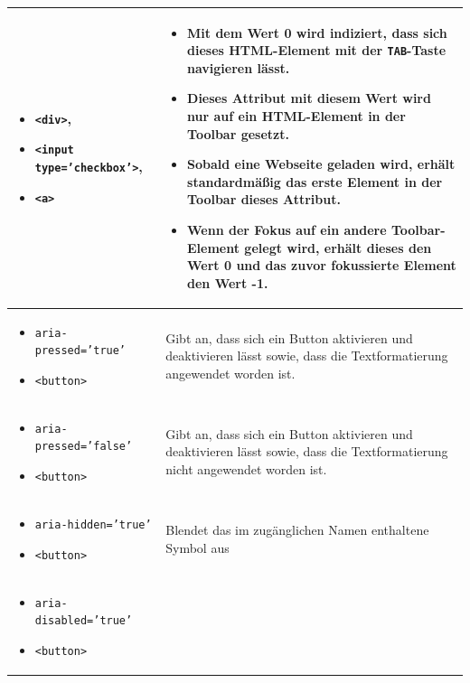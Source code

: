 \begin{longtable}{| p{} | p{} |}
\begin{itemize}[label={}, leftmargin=*]
		\item \texttt{<div>},
		\item \texttt{<input type='checkbox'>},
		\item \texttt{<a>}
	\end{itemize} 
	 & \begin{itemize}
		\item Mit dem Wert 0 wird indiziert, dass sich dieses HTML-Element mit der \texttt{TAB}-Taste navigieren 
		lässt.
		\item  Dieses Attribut mit diesem Wert wird nur auf ein HTML-Element in der Toolbar gesetzt.
		\item Sobald eine Webseite geladen wird, erhält standardmäßig das erste Element in der Toolbar dieses 
			Attribut.
		\item Wenn der Fokus auf ein andere Toolbar-Element gelegt wird, erhält dieses den Wert 0 und das 
			zuvor fokussierte Element den Wert -1.
	\end{itemize} \\
	\hline
	\begin{itemize}[label={}, leftmargin=*]
		\item \texttt{aria-pressed='true'} 
		\item \texttt{<button>}
	\end{itemize}
	& Gibt an, dass sich ein Button aktivieren und deaktivieren lässt sowie, dass die 	
		Textformatierung angewendet worden ist.\\
	\hline
	\begin{itemize}[label={}, leftmargin=*]
		\item \texttt{aria-pressed='false'}
		\item \texttt{<button>}
	\end{itemize}
	 & Gibt an, dass sich ein Button aktivieren und deaktivieren lässt sowie, dass die
		Textformatierung nicht angewendet worden ist.\\
	\hline
	\begin{itemize}[label={}, leftmargin=*]
		\item \texttt{aria-hidden='true'} 
		\item \texttt{<button>}
	\end{itemize}
	& Blendet das im zugänglichen Namen enthaltene Symbol aus\\
	\hline
	\begin{itemize}[label={}, leftmargin=*]
		\item \texttt{aria-disabled='true'} 
		\item \texttt{<button>}
	\end{itemize}

\end{longtable}
